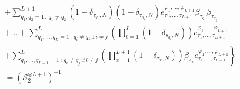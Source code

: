 \documentclass[10pt]{article}
\numberwithin{equation}{section}
\numberwithin{equation}{subsection}
\begin{document}
\begin{align*}
    	\\&+\left. \sum_{q_{1},q_{2}=1\,:\,q_{1}\neq q_{2}}^{L+1}(1-\delta_{\tau_{q_{1}},N})(1-\delta_{\tau_{q_{2}},N})e_{\tau_{1},\ldots,\tau_{L+1}}^{\varphi_{1},\ldots,\varphi_{L+1}}\beta_{\tau_{q_{1}}}\beta_{\tau_{q_{2}}}\right.
    	\\&+\left.
    	\ldots+	\sum_{q_{1},\ldots,q_{L}=1\,:\,q_{i}\neq q_{j}\,\text{if}\,i\neq j}^{L}\left(\prod_{t=1}^{L}(1-\delta_{s_{q_{t}},N})\right)e_{\tau_{1},\ldots,\tau_{L+1}}^{\varphi_{1},\ldots,\varphi_{L+1}}
    	\right. \\&+ \left. 
    	\sum_{q_{1},\ldots,q_{L+1}=1\,:\,q_{i}\neq q_{j}\,\text{if}\,i\neq j}^{L}\left(\prod_{x=1}^{L+1}(1-\delta_{\tau_{x},N})\right)\beta_{\tau_{x}}e_{\tau_{1},\ldots,\tau_{L+1}}^{\varphi_{1},\ldots,\varphi_{L+1}} \right\}
    	\\&=
    	\left(\mathcal{S}_{2}^{\otimes L+1}\right)^{-1}
\end{align*}
\end{document}
